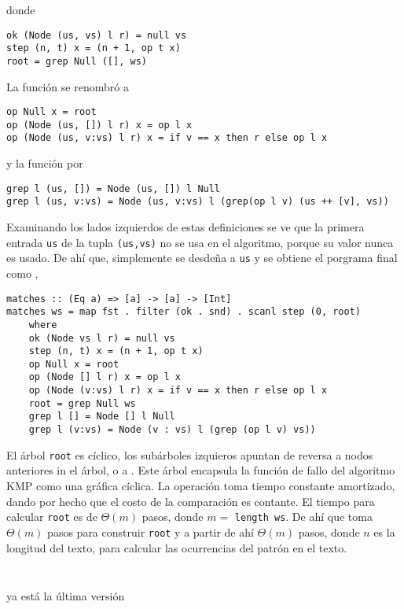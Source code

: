 donde
\begin{verbatim}
ok (Node (us, vs) l r) = null vs
step (n, t) x = (n + 1, op t x)
root = grep Null ([], ws)
\end{verbatim}

La función  se renombró a 
\begin{verbatim}
op Null x = root
op (Node (us, []) l r) x = op l x
op (Node (us, v:vs) l r) x = if v == x then r else op l x
\end{verbatim}

y la función  por
\begin{verbatim}
grep l (us, []) = Node (us, []) l Null
grep l (us, v:vs) = Node (us, v:vs) l (grep(op l v) (us ++ [v], vs))
\end{verbatim}

Examinando los lados izquierdos de estas definiciones se ve que la primera entrada \texttt{us} de la tupla \texttt{(us,vs)} no se usa en el algoritmo,
porque su valor nunca es usado. De ahí que, simplemente se desdeña a \texttt{us} y se obtiene el porgrama final como , 

\begin{verbatim}
matches :: (Eq a) => [a] -> [a] -> [Int]
matches ws = map fst . filter (ok . snd) . scanl step (0, root)
    where
    ok (Node vs l r) = null vs
    step (n, t) x = (n + 1, op t x)
    op Null x = root
    op (Node [] l r) x = op l x
    op (Node (v:vs) l r) x = if v == x then r else op l x
    root = grep Null ws
    grep l [] = Node [] l Null
    grep l (v:vs) = Node (v : vs) l (grep (op l v) vs))
\end{verbatim}

El árbol \texttt{root} es cíclico, %
los subárboles izquieros apuntan de reversa a nodos anteriores in el árbol, o a .
Este árbol encapsula la función de fallo %
del algoritmo KMP como una gráfica cíclica. La operación  toma tiempo constante amortizado, dando por hecho que el costo de la comparación es contante.
El tiempo para calcular \texttt{root} es de $\Theta(m)$ pasos, donde $m =$ \texttt{length ws}. De ahí que  toma $\Theta(m)$ pasos para construir \texttt{root}
y a partir de ahí $\Theta(m)$ pasos, donde $n$ es la longitud del texto, para calcular las ocurrencias del patrón en el texto.
\inputminted{haskell}{codigo/haskell/MP1.hs}
\inputminted{haskell}{codigo/haskell/MP2.hs}



ya está la última versión
\inputminted{haskell}{codigo/haskell/KMP.hs}

